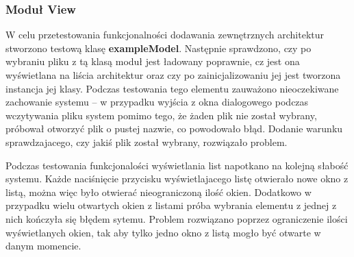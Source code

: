 \documentclass[a4paper,twoside,12pt]{book}
\begin{document}
{\subsubsection{Moduł View}
{W celu przetestowania funkcjonalności dodawania zewnętrznych architektur stworzono testową klasę \textbf{exampleModel}. Następnie sprawdzono, czy po wybraniu pliku z tą klasą moduł jest ładowany poprawnie, cz jest ona wyświetlana na liścia architektur oraz czy po zainicjalizowaniu jej jest tworzona instancja jej klasy. Podczas testowania tego elementu zauważono nieoczekiwane zachowanie systemu – w przypadku wyjścia z okna dialogowego podczas wczytywania pliku system pomimo tego, że żaden plik nie został wybrany, próbował otworzyć plik o pustej nazwie, co powodowało błąd. Dodanie warunku sprawdzajacego, czy jakiś plik został wybrany, rozwiązało problem.}

{Podczas testowania funkcjonalości wyświetlania list napotkano na kolejną słabość systemu. Każde naciśnięcie przycisku wyświetlajacego listę otwierało nowe okno z listą, można więc było otwierać nieograniczoną ilość okien. Dodatkowo w przypadku wielu otwartych okien z listami próba wybrania elementu z jednej z nich kończyła się błędem sytemu. Problem rozwiązano poprzez ograniczenie ilości wyświetlanych okien, tak aby tylko jedno okno z listą mogło być otwarte w danym momencie. 
}

}
\end{document}
